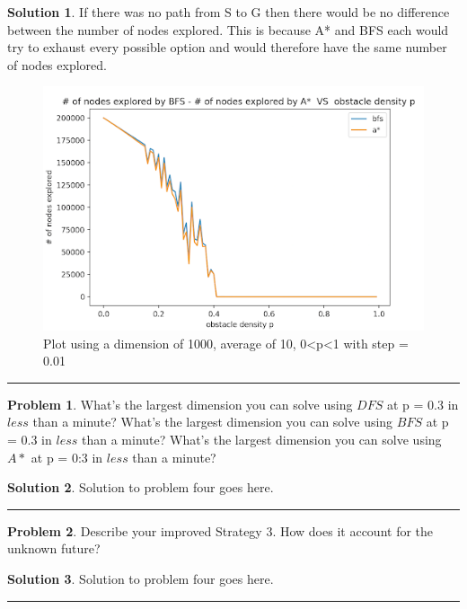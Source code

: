 \documentclass{article}
\theoremstyle{definition}
\newtheorem{problem}{Problem}
\def\fline{\rule{0.75\linewidth}{0.5pt}}
\newcommand{\finishline}{\vspace{-15pt}\begin{center}\fline\end{center}}
\newtheorem*{solution*}{Solution}
\newenvironment{solution}{\begin{solution*}}{{\finishline} \end{solution*}}
\begin{document}
\smallskip

\begin{solution}
    If there was no path from S to G then there would be no difference between the number of nodes explored. This is because A* and BFS each would try to exhaust every possible option and would therefore have the same number of nodes explored.
    
	\begin{figure}[h]
	\includegraphics[width=12cm]{dim1000,10avg,step0.01.png}
	\caption{Plot using a dimension of 1000, average of 10, 0<p<1 with step = 0.01}
	\centering
	\end{figure}
	
\end{solution}

\smallskip

\begin{problem}
	What's the largest dimension you can solve using $DFS$ at p = 0.3 in $less$ than a minute? What's the largest dimension you can solve using $BFS$ at p = 0.3 in $less$ than a minute? What's the largest dimension you can solve using $A*$ at p = 0:3 in $less$ than a minute?  
\end{problem}

\smallskip

\begin{solution}
	Solution to problem four goes here. 
\end{solution}

\smallskip

\begin{problem}
	Describe your improved Strategy 3. How does it account for the unknown future?
\end{problem}

\smallskip

\begin{solution}
	Solution to problem four goes here. 
\end{solution}
\end{document}
